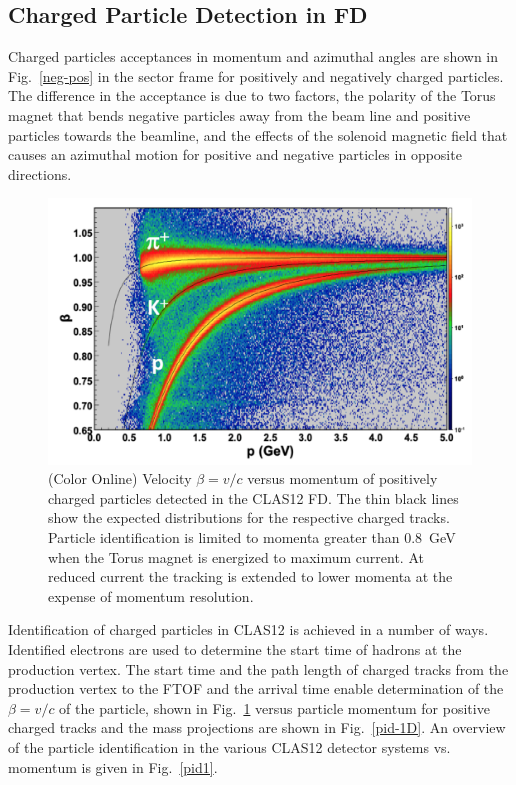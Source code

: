 \documentclass[final,3p,twocolumn]{elsarticle}
\begin{document}
\subsection{Charged Particle Detection in FD}
 
Charged particles acceptances in momentum and azimuthal angles are shown in Fig.~\ref{neg-pos} in the sector
frame for positively and negatively charged particles. The difference in the acceptance is due to two factors, the
polarity of the Torus magnet that bends negative particles away from the beam line and positive particles towards
the beamline, and the effects of the solenoid magnetic field that causes an azimuthal motion for positive and negative
particles in opposite directions. 

\begin{figure}[htbp!]
\centerline{\includegraphics[width=1.1\columnwidth]{FTOF1b_pid.png}}
\caption{(Color Online) Velocity $\beta = v/c $ versus momentum of positively charged particles detected in the CLAS12 FD. The
thin black lines show the expected distributions for the respective charged tracks. Particle identification is limited
to momenta greater than 0.8~GeV when the Torus magnet is energized to maximum current. At reduced current the
tracking is extended to lower momenta at the expense of momentum resolution.}
\label{pid}
\end{figure} 

Identification of charged particles in CLAS12 is achieved in a number of ways. Identified electrons are used to
determine the start time of hadrons at the production vertex. The start time and the path length of charged tracks
from the production vertex to the FTOF and the arrival time enable determination of the $\beta = v/c$ of the
particle, shown in Fig.~\ref{pid} versus particle momentum for positive charged tracks and the mass projections are
shown in Fig.~\ref{pid-1D}.  An overview of the particle identification in the various CLAS12 detector systems vs.
momentum is given in Fig.~\ref{pid1}. 
\end{document}
